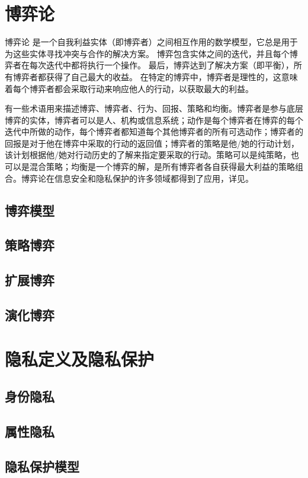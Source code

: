 \section{博弈论}
博弈论\cite{owen2001,gibbons1992} 是一个自我利益实体（即博弈者）之间相互作用的数学模型，它总是用于为这些实体寻找冲突与合作的解决方案。 博弈包含实体之间的迭代，并且每个博弈者在每次迭代中都将执行一个操作。 最后，博弈达到了解决方案（即平衡），所有博弈者都获得了自己最大的收益。 在特定的博弈中，博弈者是理性的，这意味着每个博弈者都会采取行动来响应他人的行动，以获取最大的利益。

有一些术语用来描述博弈、博弈者、行为、回报、策略和均衡\cite{liang2013}。博弈者是参与底层博弈的实体，博弈者可以是人、机构或信息系统；动作是每个博弈者在博弈的每个迭代中所做的动作，每个博弈者都知道每个其他博弈者的所有可选动作；博弈者的回报是对于他在博弈中采取的行动的返回值；博弈者的策略是他/她的行动计划，该计划根据他/她对行动历史的了解来指定要采取的行动。策略可以是纯策略，也可以是混合策略；均衡是一个博弈的解，是所有博弈者各自获得最大利益的策略组合。博弈论在信息安全和隐私保护的许多领域都得到了应用，详见\cite{liang2013,tian2019}。
\subsection{博弈模型}
\subsection{策略博弈}
\subsection{扩展博弈}
\subsection{演化博弈}


\section{隐私定义及隐私保护}
\subsection{身份隐私}
\subsection{属性隐私}
\subsection{隐私保护模型}

